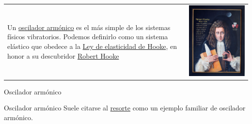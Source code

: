 \documentclass{article}
\begin{document}
\begin{tabular}{m{6cm} m{2cm}}
 Un \href{http://es.wikipedia.org/wiki/Oscilador_armónico}{oscilador armónico} es el más simple de los sistemas físicos vibratorios. Podemos definirlo como un sistema
elástico que obedece a la \href{http://es.wikipedia.org/wiki/Ley_de_Hooke}{Ley de elasticidad de Hooke}, en honor a su descubridor 
\href{http://es.wikipedia.org/wiki/Robert_Hooke}{Robert Hooke} & \includegraphics[scale=.15]{imagenes/Hooke.JPG}\\
\end{tabular}

 


{Oscilador armónico}\label{resortito}

 


{Oscilador armónico}
Suele citarse al \href{http://es.wikipedia.org/wiki/Resorte}{resorte} como un ejemplo familiar de oscilador armónico.
\end{document}
